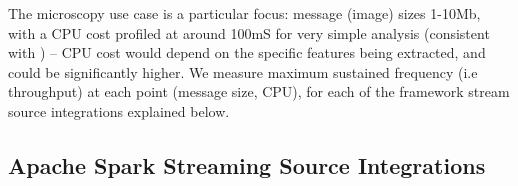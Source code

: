 \documentclass[conference]{IEEEtran}
\begin{document}




The microscopy use case is a particular focus: message (image) sizes 1-10Mb, with a CPU cost profiled at around 100mS for very simple analysis (consistent with \cite{torruangwatthanaHarmonicIOScalableData2018}) -- CPU cost would depend on the specific features being extracted, and could be significantly higher.
We measure maximum sustained frequency (i.e throughput) at each point (message size, CPU), for each of the framework stream source integrations explained below.%







\subsection{Apache Spark Streaming Source Integrations}
\end{document}
